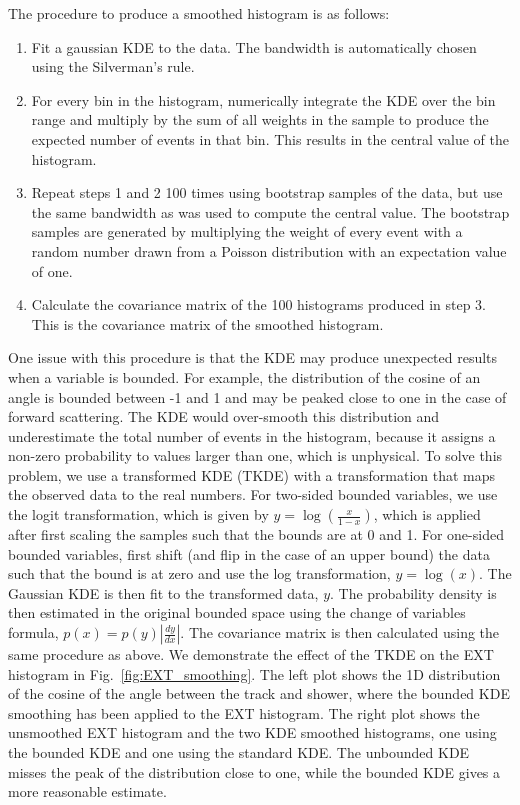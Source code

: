 The procedure to produce a smoothed histogram is as follows:
\begin{enumerate}
    \item Fit a gaussian KDE to the data. The bandwidth is automatically chosen using the Silverman's rule. 
    \item For every bin in the histogram, numerically integrate the KDE over the bin range and multiply by the sum of all weights in the sample to produce the expected number of events in that bin. This results in the central value of the histogram.
    \item Repeat steps 1 and 2 100 times using bootstrap samples of the data, but use the same bandwidth as was used to compute the central value. The bootstrap samples are generated by multiplying the weight of every event with a random number drawn from a Poisson distribution with an expectation value of one.
    \item Calculate the covariance matrix of the 100 histograms produced in step 3. This is the covariance matrix of the smoothed histogram.
\end{enumerate}
One issue with this procedure is that the KDE may produce unexpected results when a variable is bounded. For example, the distribution of the cosine of an angle is bounded between -1 and 1 and may be peaked close to one in the case of forward scattering. The KDE would over-smooth this distribution and underestimate the total number of events in the histogram, because it assigns a non-zero probability to values larger than one, which is unphysical. To solve this problem, we use a transformed KDE (TKDE) with a transformation that maps the observed data to the real numbers. For two-sided bounded variables, we use the logit transformation, which is given by $y  = \log\left(\frac{x}{1-x}\right)$, which is applied after first scaling the samples such that the bounds are at 0 and 1. For one-sided bounded variables, first shift (and flip in the case of an upper bound) the data such that the bound is at zero and use the log transformation, $y =  \log(x)$. The Gaussian KDE is then fit to the transformed data, $y$. The probability density is then estimated in the original bounded space using the change of variables formula, $p(x) = p(y)\left|\frac{dy}{dx}\right|$. The covariance matrix is then calculated using the same procedure as above. We demonstrate the effect of the TKDE on the EXT histogram in Fig.~\ref{fig:EXT_smoothing}. The left plot shows the 1D distribution of the cosine of the angle between the track and shower, where the bounded KDE smoothing has been applied to the EXT histogram. The right plot shows the unsmoothed EXT histogram and the two KDE smoothed histograms, one using the bounded KDE and one using the standard KDE. The unbounded KDE misses the peak of the distribution close to one, while the bounded KDE gives a more reasonable estimate.
